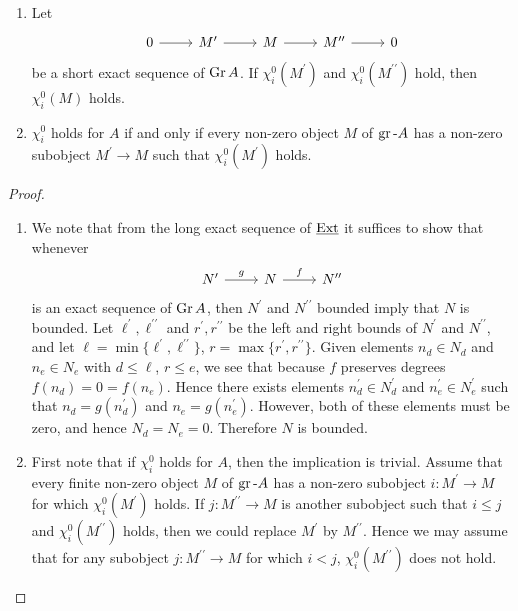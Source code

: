 \documentclass[dissertation.tex]{subfiles}
\begin{document}
\begin{prop}
  \begin{prop}
    \begin{enumerate}
    \item
      Let
      $$\begin{tikzcd}
        0 \arrow{r} & M^\prime \arrow{r} & M \arrow{r} & M^{\prime\prime} \arrow{r} & 0
      \end{tikzcd}$$
      be a short exact sequence of $\operatorname{Gr}A$.
      If $\chi^0_i(M^\prime)$ and $\chi^0_i(M^{\prime\prime})$ hold, then $\chi^0_i(M)$ holds.
    \item
      $\chi^0_i$ holds for $A$ if and only if every non-zero object $M$ of $\operatorname{gr}\text{-}A$ has a non-zero subobject $M^\prime \rightarrow M$ such that $\chi^0_i(M^\prime)$ holds.
    \end{enumerate}
    \begin{proof}
      \begin{enumerate}
      \item
        We note that from the long exact sequence of $\operatorname{\underline{Ext}}$ it suffices to show that whenever
        $$\begin{tikzcd}
          N^\prime \arrow{r}{g} & N \arrow{r}{f} & N^{\prime\prime}
        \end{tikzcd}$$
        is an exact sequence of $\operatorname{Gr}A$, then $N^\prime$ and $N^{\prime\prime}$ bounded imply that $N$ is bounded.
        Let $\ell^\prime, \ell^{\prime\prime}$ and $r^\prime, r^{\prime\prime}$ be the left and right bounds of $N^\prime$ and $N^{\prime\prime}$, and let $\ell = \min\{\ell^\prime, \ell^{\prime\prime}\}$, $r = \max\{r^\prime, r^{\prime\prime}\}$.
        Given elements $n_d \in N_d$ and $n_e \in N_e$ with $d \leq \ell$, $r \leq e$, we see that because $f$ preserves degrees $f(n_d) = 0 = f(n_e)$.
        Hence there exists elements $n^\prime_d \in N^\prime_d$ and $n^\prime_e \in N^\prime_e$ such that $n_d = g(n^\prime_d)$ and $n_e = g(n^\prime_e)$.
        However, both of these elements must be zero, and hence $N_d = N_e = 0$.
        Therefore $N$ is bounded.
      \item
        First note that if $\chi^0_i$ holds for $A$, then the implication is trivial.
        Assume that every finite non-zero object $M$ of $\operatorname{gr}\text{-}A$ has a non-zero subobject $i \colon M^\prime \rightarrow M$ for which $\chi^0_i(M^\prime)$ holds.
        If $j \colon M^{\prime\prime} \rightarrow M$ is another subobject such that $i \leq j$ and  $\chi^0_i(M^{\prime\prime})$ holds, then we could replace $M^\prime$ by $M^{\prime\prime}$.
        Hence we may assume that for any subobject $j \colon M^{\prime\prime} \rightarrow M$ for which $i < j$, $\chi^0_i(M^{\prime\prime})$ does not hold.
        

\end{enumerate}
\end{proof}
\end{prop}
\end{prop}
\end{document}

